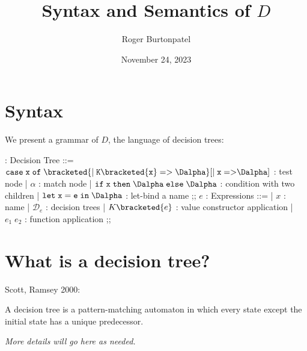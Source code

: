 \documentclass{article}
\title{Syntax and Semantics of $D$}
\author{Roger Burtonpatel}
\date{November 24, 2023}
\begin{document}
\maketitle

\section{Syntax}

We present a grammar of $D$, the language of decision trees: 


\begin{center}
  \begin{bnf}
    \Dalpha : \textsf{Decision Tree} ::= 
    $\tt{case} \; x \; \tt{of} \; 
    \bracketed{\vert \; K\bracketed{x} \; \tt{=>} \; \Dalpha}
    [\vert \; x \; \tt{=>} \Dalpha]$ : test node 
    | $\alpha$ : match node 
    | $\tt{if} \; x \; \tt{then} \; \Dalpha \; \tt{else} \; \Dalpha$ : condition with two children 
    | $\tt{let} \; x \; \tt{=} \; e \; \tt{in} \; \Dalpha$ : let-bind a name
    ;;
    $e$ : \textsf{Expressions} ::=
    | $x$ : name
    | $\mathcal{D}_{e}$ : decision trees 
    | $K \bracketed{e}$ : value constructor application 
    | $e_1 \; e_2$ : function application 
    ;;
  \end{bnf}
\end{center}

\section{What is a decision tree?}
Scott, Ramsey 2000: 

A decision tree is a pattern-matching automaton in which every state except the
initial state has a unique predecessor. 

\bigskip

\it{More details will go here as needed.}


\end{document}
